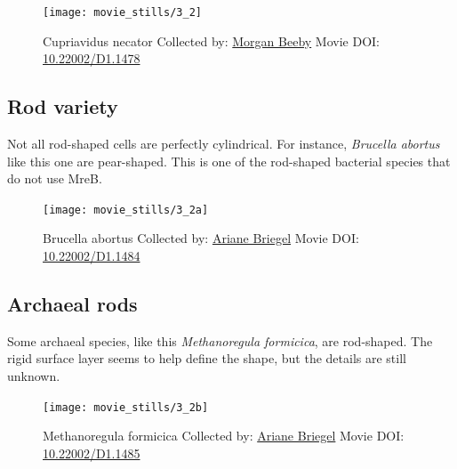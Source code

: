 \documentclass[]{tufte-book}
\begin{document}
\begin{figure}
\texttt{[image: movie\_stills/3\_2]} \caption[Cupriavidus necator Collected by:
\protect\hyperlink{morgan_beeby}{Morgan Beeby} Movie DOI:
\href{https://doi.org/10.22002/D1.1478}{10.22002/D1.1478}]{Cupriavidus necator Collected by:
\protect\hyperlink{morgan_beeby}{Morgan Beeby} Movie DOI:
\href{https://doi.org/10.22002/D1.1478}{10.22002/D1.1478}}\label{fig:3-2}
\end{figure}

\hypertarget{Rod_variety}{\subsection{Rod variety}\label{Rod_variety}}

Not all rod-shaped cells are perfectly cylindrical. For instance,
\emph{Brucella abortus} like this one are pear-shaped. This is one of
the rod-shaped bacterial species that do not use MreB.





\begin{figure}
\texttt{[image: movie\_stills/3\_2a]} \caption[Brucella abortus Collected by:
\protect\hyperlink{ariane_briegel}{Ariane Briegel} Movie DOI:
\href{https://doi.org/10.22002/D1.1484}{10.22002/D1.1484}]{Brucella abortus Collected by:
\protect\hyperlink{ariane_briegel}{Ariane Briegel} Movie DOI:
\href{https://doi.org/10.22002/D1.1484}{10.22002/D1.1484}}\label{fig:3-2a}
\end{figure}

\hypertarget{Archaeal_rods}{\subsection{Archaeal
rods}\label{Archaeal_rods}}

Some archaeal species, like this \emph{Methanoregula formicica}, are
rod-shaped. The rigid surface layer seems to help define the shape, but
the details are still unknown.





\begin{figure}
\texttt{[image: movie\_stills/3\_2b]} \caption[Methanoregula formicica Collected by:
\protect\hyperlink{ariane_briegel}{Ariane Briegel} Movie DOI:
\href{https://doi.org/10.22002/D1.1485}{10.22002/D1.1485}]{Methanoregula formicica Collected by:
\protect\hyperlink{ariane_briegel}{Ariane Briegel} Movie DOI:
\href{https://doi.org/10.22002/D1.1485}{10.22002/D1.1485}}\label{fig:3-2b}
\end{figure}
\end{document}
